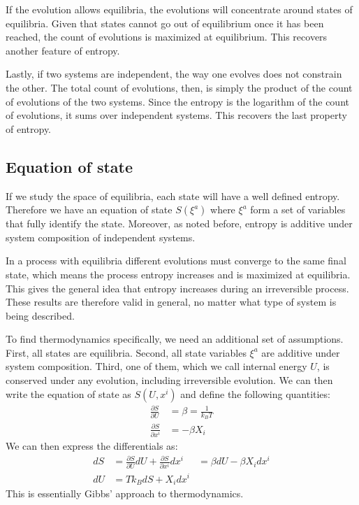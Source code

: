 \documentclass[11pt,letterpaper,fleqn]{memoir} %
\begin{document}
If the evolution allows equilibria, the evolutions will concentrate around states of equilibria. Given that states cannot go out of equilibrium once it has been reached, the count of evolutions is maximized at equilibrium. This recovers another feature of entropy.

Lastly, if two systems are independent, the way one evolves does not constrain the other. The total count of evolutions, then, is simply the product of the count of evolutions of the two systems. Since the entropy is the logarithm of the count of evolutions, it sums over independent systems. This recovers the last property of entropy.

\subsection{Equation of state}

If we study the space of equilibria, each state will have a well defined entropy. Therefore we have an equation of state $S(\xi^a)$ where $\xi^a$ form a set of variables that fully identify the state. Moreover, as noted before, entropy is additive under system composition of independent systems.

In a process with equilibria different evolutions must converge to the same final state, which means the process entropy increases and is maximized at equilibria. This gives the general idea that entropy increases during an irreversible process. These results are therefore valid in general, no matter what type of system is being described.

To find thermodynamics specifically, we need an additional set of assumptions. First, all states are equilibria. Second, all state variables $\xi^a$ are additive under system composition. Third, one of them, which we call internal energy $U$, is conserved under any evolution, including irreversible evolution. We can then write the equation of state as $S(U, x^i)$ and define the following quantities:
\begin{equation}
	\begin{aligned}
		\frac{\partial S}{\partial U} &= \beta = \frac{1}{k_B T} \\
		\frac{\partial S}{\partial x^i} &= - \beta X_i
	\end{aligned}
\end{equation}
We can then express the differentials as:
\begin{equation}
	\begin{aligned}
		dS &= \frac{\partial S}{\partial U} dU + \frac{\partial S}{\partial x^i} dx^i &= \beta dU - \beta X_i dx^i \\
		dU & = T k_B dS + X_i dx^i
	\end{aligned}
\end{equation}
This is essentially Gibbs' approach to thermodynamics.
\end{document}
